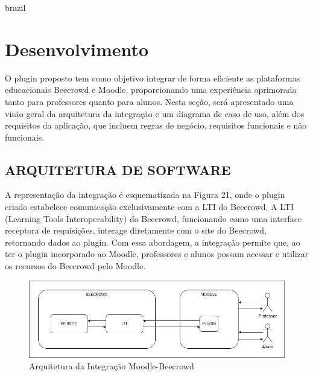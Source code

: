 

\begin{otherlanguage*}{brazil}

    \chapter{Desenvolvimento}

    O plugin proposto tem como objetivo integrar de forma eficiente as plataformas educacionais Beecrowd e Moodle, proporcionando uma experiência aprimorada tanto para professores quanto para alunos. Nesta seção, será apresentado uma visão geral da arquitetura da integração e um diagrama de caso de uso, além dos requisitos da aplicação, que incluem regras de negócio, requisitos funcionais e não funcionais.

    \section{ARQUITETURA DE SOFTWARE}

    A representação da integração é esquematizada na Figura 21, onde o plugin criado estabelece comunicação exclusivamente com a LTI do Beecrowd. A LTI (Learning Tools Interoperability) do Beecrowd, funcionando como uma interface receptora de requisições, interage diretamente com o site do Beecrowd, retornando dados ao plugin. Com essa abordagem, a integração permite que, ao ter o plugin incorporado ao Moodle, professores e alunos possam acessar e utilizar os recursos do Beecrowd pelo Moodle.
    
    \begin{figure}[h!]
        \centering
             \caption{Arquitetura da Integração Moodle-Beecrowd}
             \label{fig:ModeloConceitual}
            \includegraphics[scale=0.5]{pictures/arquitetura.png}
    \end{figure}


\end{otherlanguage*}
